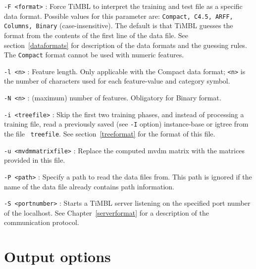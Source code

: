 \documentclass{report}
\begin{document}
\begin{description}

\item {\tt -F <format>} : Force TiMBL to interpret the training and
test file as a specific data format. Possible values for this
parameter are: {\tt Compact, C4.5, ARFF, Columns, Binary}
(case-insensitive). The default is that TiMBL guesses the format from
the contents of the first line of the data file. See
section~\ref{dataformats} for description of the data formats and the
guessing rules. The {\tt Compact} format cannot be used with numeric
features.

\item {\tt -l <n>} : Feature length. Only applicable with the Compact
data format; {\tt <n>} is the number of characters used for each
feature-value and category symbol.

\item {\tt -N <n>} : (maximum) number of features. Obligatory for
Binary format.

\item {\tt -i <treefile>} : Skip the first two training phases, and
instead of processing a training file, read a previously saved (see
{\tt -I} option) instance-base or {\sc igtree} from the file {\tt
treefile}. See section~\ref{treeformat} for the format of this file.

\item {\tt -u <mvdmmatrixfile>} : Replace the computed {\sc mvdm} matrix
with the matrices provided in this file.

\item {\tt -P <path>} : Specify a path to read the data files
from. This path is ignored if the name of the data file already
contains path information.

\item {\tt -S <portnumber>} : Starts a TiMBL server listening on the
specified port number of the localhost. See
Chapter~\ref{serverformat} for a description of the communication
protocol.

\end{description}

\section{Output options}
\end{document}

